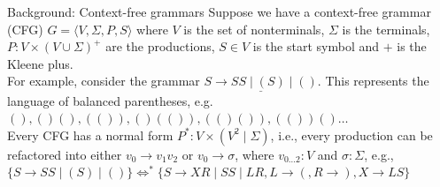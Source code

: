 \documentclass{beamer}
\begin{document}
    \begin{frame}{Background: Context-free grammars}
        Suppose we have a context-free grammar (CFG) $G = \langle V, \Sigma, P, S\rangle$ where $V$ is the set of nonterminals, $\Sigma$ is the terminals, $P: V\times (V \cup \Sigma)^+$ are the productions, $S\in V$ is the start symbol and $+$ is the Kleene plus.\newline\\
        For example, consider the grammar $\underline{S \rightarrow S S \mid ( S ) \mid ()}$. This represents the language of balanced parentheses, e.g. $(), ()(), (()), ()(()), (()()), (())()\ldots$\newline\\
        Every CFG has a normal form $P^*: V \times (V^2 \mid \Sigma)$, i.e., every production can be refactored into either $v_0 \rightarrow v_1 v_2$ or $v_0 \rightarrow \sigma$, where $v_{0\ldots2}: V$ and $\sigma: \Sigma$, e.g., $\{S \rightarrow S S \mid ( S ) \mid ()\}\Leftrightarrow^*\{S\rightarrow XR \mid SS \mid LR, L \rightarrow (, R \rightarrow ), X\rightarrow LS\}$


\end{frame}
\end{document}
